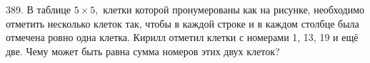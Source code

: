 389. В таблице $5\times5,$ клетки которой пронумерованы как на рисунке, необходимо отметить несколько клеток так, чтобы в каждой строке и в каждом столбце была отмечена ровно одна клетка. Кирилл отметил клетки с номерами 1, 13, 19 и ещё две. Чему может быть равна сумма номеров этих двух клеток?\\
\begin{figure}[ht!]
\end{figure}\\
